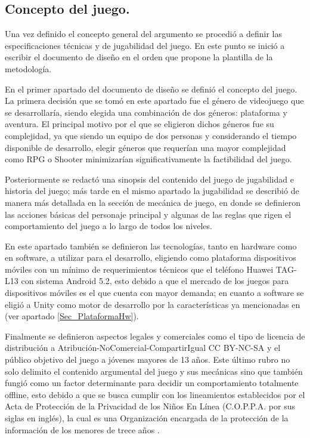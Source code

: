 \subsection{Concepto del juego.}
Una vez definido el concepto general del argumento se procedió a definir 
las especificaciones técnicas y de jugabilidad del juego. En este punto se 
inició a escribir el documento de diseño en el orden que propone la plantilla 
de la metodología. 
\\
\par
En el primer apartado del documento de diseño se definió el concepto del juego. 
La primera decisión que se tomó en este apartado fue el género de videojuego que 
se desarrollaría, siendo elegida una combinación de dos géneros: plataforma y 
aventura. El principal motivo por el que se eligieron dichos géneros fue su 
complejidad, ya que siendo un equipo de dos personas y considerando el tiempo 
disponible de desarrollo, elegir géneros que requerían una mayor complejidad 
como RPG o Shooter minimizarían significativamente la factibilidad del juego.  
\\
\par
Posteriormente se redactó una sinopsis del contenido del juego de jugabilidad e 
historia del juego; más tarde en el mismo apartado la jugabilidad se describió 
de manera más detallada en la sección de mecánica de juego, en donde se 
definieron las acciones básicas del personaje principal y algunas de las reglas 
que rigen el comportamiento del juego a lo largo de todos los niveles. 
\\
\par
En este apartado también se definieron las tecnologías, tanto en hardware como 
en software, a utilizar para el desarrollo, eligiendo como plataforma dispositivos 
móviles con un mínimo de requerimientos técnicos que el teléfono Huawei TAG-L13 
con sistema Android 5.2, esto debido a que el mercado de los juegos para 
dispositivos móviles es el que cuenta con mayor demanda\cite{Ref_IndusMEx}; en 
cuanto a software se eligió a Unity como motor de desarrollo por la 
características ya mencionadas en (ver apartado \ref{Sec_PlataformaHw}). 
\\
\par
Finalmente se definieron aspectos legales y comerciales como el tipo de licencia 
de distribución a Atribución-NoComercial-CompartirIgual CC BY-NC-SA y el público 
objetivo del juego a jóvenes mayores de 13 años. Este último rubro no solo delimito 
el contenido argumental del juego y sus mecánicas sino que también fungió como un 
factor determinante para decidir un comportamiento totalmente offline, esto 
debido a que se busca cumplir con los lineamientos establecidos por el Acta de 
Protección de la Privacidad de los Niños En Línea (C.O.P.P.A. por sus siglas en 
inglés), la cual es una Organización encargada de la protección de la información 
de los menores de trece años \cite{RefCOPPA}. 

